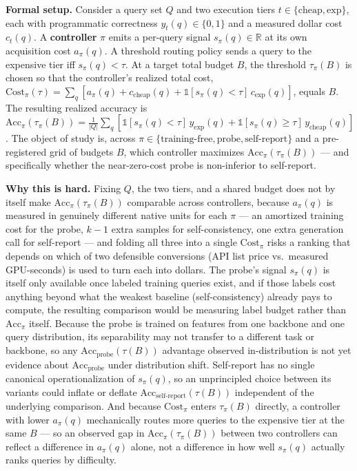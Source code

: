 \documentclass[11pt]{article}
\begin{document}
\noindent\textbf{Formal setup.} Consider a query set $Q$ and two execution tiers $t \in \{\text{cheap}, \text{exp}\}$, each with programmatic correctness $y_t(q) \in \{0,1\}$ and a measured dollar cost $c_t(q)$. A \textbf{controller} $\pi$ emits a per-query signal $s_\pi(q) \in \mathbb{R}$ at its own acquisition cost $a_\pi(q)$. A threshold routing policy sends a query to the expensive tier iff $s_\pi(q) < \tau$. At a target total budget $B$, the threshold $\tau_\pi(B)$ is chosen so that the controller's realized total cost, $\text{Cost}_\pi(\tau) = \sum_q \left[ a_\pi(q) + c_{\text{cheap}}(q) + \mathbb{1}[s_\pi(q)<\tau]\,c_{\text{exp}}(q) \right]$, equals $B$. The resulting realized accuracy is $\text{Acc}_\pi(\tau_\pi(B)) = \frac{1}{|Q|}\sum_q \left[ \mathbb{1}[s_\pi(q)<\tau]\,y_{\text{exp}}(q) + \mathbb{1}[s_\pi(q)\ge\tau]\,y_{\text{cheap}}(q) \right]$. The object of study is, across $\pi \in \{\text{training-free}, \text{probe}, \text{self-report}\}$ and a pre-registered grid of budgets $B$, which controller maximizes $\text{Acc}_\pi(\tau_\pi(B))$ --- and specifically whether the near-zero-cost probe is non-inferior to self-report.

\noindent\textbf{Why this is hard.} Fixing $Q$, the two tiers, and a shared budget does not by itself make $\text{Acc}_\pi(\tau_\pi(B))$ comparable across controllers, because $a_\pi(q)$ is measured in genuinely different native units for each $\pi$ --- an amortized training cost for the probe, $k-1$ extra samples for self-consistency, one extra generation call for self-report --- and folding all three into a single $\text{Cost}_\pi$ risks a ranking that depends on which of two defensible conversions (API list price vs.\ measured GPU-seconds) is used to turn each into dollars. The probe's signal $s_\pi(q)$ is itself only available once labeled training queries exist, and if those labels cost anything beyond what the weakest baseline (self-consistency) already pays to compute, the resulting comparison would be measuring label budget rather than $\text{Acc}_\pi$ itself. Because the probe is trained on features from one backbone and one query distribution, its separability may not transfer to a different task or backbone, so any $\text{Acc}_{\text{probe}}(\tau(B))$ advantage observed in-distribution is not yet evidence about $\text{Acc}_{\text{probe}}$ under distribution shift. Self-report has no single canonical operationalization of $s_\pi(q)$, so an unprincipled choice between its variants could inflate or deflate $\text{Acc}_{\text{self-report}}(\tau(B))$ independent of the underlying comparison. And because $\text{Cost}_\pi$ enters $\tau_\pi(B)$ directly, a controller with lower $a_\pi(q)$ mechanically routes more queries to the expensive tier at the same $B$ --- so an observed gap in $\text{Acc}_\pi(\tau_\pi(B))$ between two controllers can reflect a difference in $a_\pi(q)$ alone, not a difference in how well $s_\pi(q)$ actually ranks queries by difficulty.
\end{document}
